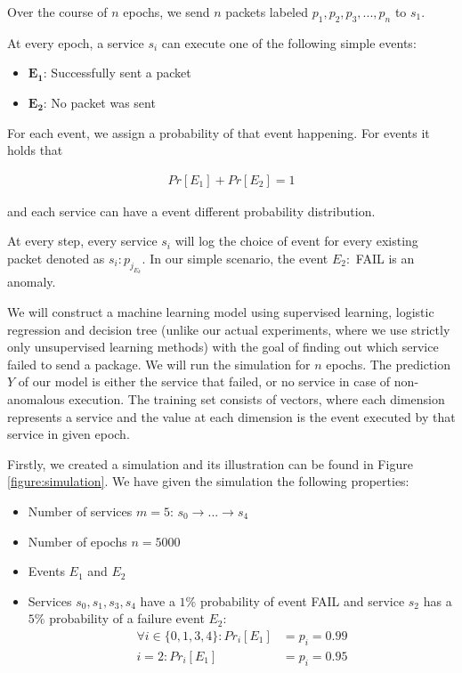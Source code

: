 Over the course of $n$ epochs, we send $n$ packets labeled $p_1, p_2, p_3, ..., p_n$ to $s_1$.

At every epoch, a service $s_i$ can execute one of the following simple events: 

\begin{itemize}
    \item $\mathbf{E_1}$: Successfully sent a packet
    \item $\mathbf{E_2}$: No packet was sent
\end{itemize}

For each event, we assign a probability of that event happening. For events it holds that 

\begin{gather*}
    Pr[E_1] + Pr[E_2] = 1
\end{gather*}

and each service can have a event different probability distribution.

At every step, every service $s_i$ will log the choice of event for every existing packet denoted as $s_i: p_{j_{E_k}}$. In our simple scenario, the event $E_2:$ FAIL is an anomaly. 

We will construct a machine learning model using supervised learning, logistic regression and decision tree (unlike our actual experiments, where we use strictly only unsupervised learning methods) with the goal of finding out which service failed to send a package. We will run the simulation for $n$ epochs. The prediction $Y$ of our model is either the service that failed, or no service in case of non-anomalous execution. The training set consists of vectors, where each dimension represents a service and the value at each dimension is the event executed by that service in given epoch. 

Firstly, we created a simulation and its illustration can be found in Figure \ref{figure:simulation}. We have given the simulation the following properties: 

\begin{itemize}
    \item Number of services $m = 5$: $s_0 \rightarrow ... \rightarrow s_{4}$
    \item Number of epochs $n = 5000$
    \item Events $E_1$ and $E_2$
    \item Services $s_0, s_1, s_3, s_4$ have a $1\%$ probability of event FAIL and service $s_2$ has a $5\%$ probability of a failure event $E_2$:
    \begin{align*}
        \forall i \in \{0, 1, 3, 4\}: Pr_i[E_1] &= p_i = 0.99 \\
        i = 2: Pr_i[E_1] &= p_i = 0.95
    \end{align*}
\end{itemize}

